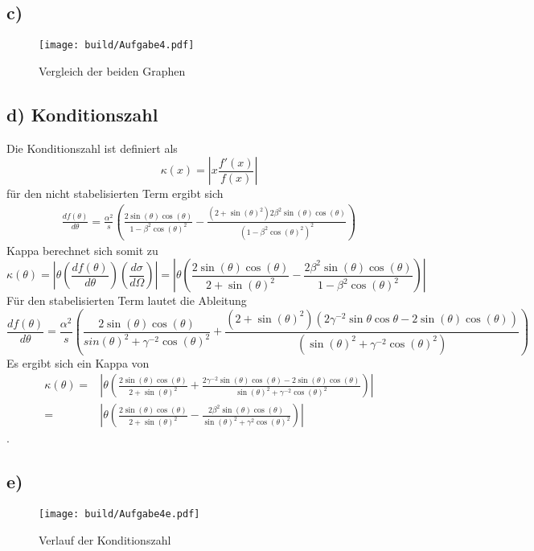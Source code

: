\subsection*{c)}
\begin{figure}
  \centering
  \texttt{[image: build/Aufgabe4.pdf]}
  \caption{Vergleich der beiden Graphen}
  \label{fig:Vergleich der beiden Graphen}
\end{figure}
\subsection*{d) Konditionszahl}
Die Konditionszahl ist definiert als 
\begin{equation}
  \kappa(x) = \left| x\frac{f'(x)}{f(x)} \right|
  \label{}
\end{equation}
für den nicht stabelisierten Term ergibt sich 
\begin{eqnarray}
  \frac{df(\theta)}{d\theta} = \frac{\alpha^2}{s} \left( \frac{2\sin(\theta)\cos(\theta)}{1 - \beta^2 \cos(\theta)^2} - \frac{(2+\sin(\theta)^2)2\beta^2\sin(\theta)\cos(\theta)}{(1-\beta^2\cos(\theta)^2)^2} \right)
  \label{}
\end{eqnarray}
Kappa berechnet sich somit zu 
\begin{equation}
  \kappa(\theta) = \left| \theta \left( \frac{df(\theta)}{d\theta} \right) \left( \frac{d\sigma}{d\Omega} \right) \right| = \left| \theta \left( \frac{2\sin(\theta)\cos(\theta)}{2 + \sin(\theta)^2} - \frac{2\beta^2\sin(\theta)\cos(\theta)}{1 - \beta^2 \cos(\theta)^2} \right) \right|
  \label{}
\end{equation}
Für den stabelisierten Term lautet die Ableitung
\begin{equation}
  \frac{df(\theta)}{d\theta} = \frac{\alpha^2}{s}\left( \frac{2\sin(\theta)\cos(\theta)}{sin(\theta)^2+\gamma^{-2}\cos(\theta)^2} + \frac{(2+\sin(\theta)^2)(2\gamma^{-2}\sin{\theta}\cos{\theta}-2\sin(\theta)\cos(\theta))}{(\sin(\theta)^2 + \gamma^{-2}\cos(\theta)^2)} \right)
  \label{<++>}
\end{equation}
Es ergibt sich ein Kappa von 
\begin{eqnarray}
  \kappa(\theta) =& \left| \theta \left( \frac{2\sin(\theta)\cos(\theta)}{2 + \sin(\theta)^2} + \frac{2\gamma^{-2}\sin(\theta)\cos(\theta) - 2\sin(\theta)\cos(\theta)}{\sin(\theta)^2 + \gamma^{-2}\cos(\theta)^2}  \right) \right| \\
  =& \left| \theta \left( \frac{2\sin(\theta)\cos(\theta)}{2 + \sin(\theta)^2} - \frac{2\beta^2\sin(\theta)\cos(\theta)}{\sin(\theta)^2 + \gamma^2 \cos(\theta)^2} \right) \right|
\end{eqnarray}.
\subsection*{e)}
\begin{figure}
  \centering
  \texttt{[image: build/Aufgabe4e.pdf]}
  \caption{Verlauf der Konditionszahl}
  \label{fig:<+label+>}
\end{figure}
